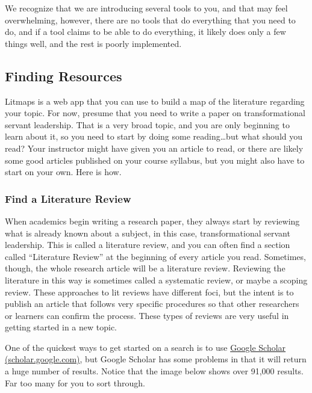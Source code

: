 \documentclass[
]{book}
\theoremstyle{definition}
\theoremstyle{definition}
\theoremstyle{definition}
\theoremstyle{definition}
\theoremstyle{remark}
\begin{document}
We recognize that we are introducing several tools to you, and that may feel overwhelming, however, there are no tools that do everything that you need to do, and if a tool claims to be able to do everything, it likely does only a few things well, and the rest is poorly implemented.

\hypertarget{finding-resources}{%
\subsection*{Finding Resources}\label{finding-resources}}

Litmaps is a web app that you can use to build a map of the literature regarding your topic. For now, presume that you need to write a paper on transformational servant leadership. That is a very broad topic, and you are only beginning to learn about it, so you need to start by doing some reading\ldots but what should you read? Your instructor might have given you an article to read, or there are likely some good articles published on your course syllabus, but you might also have to start on your own. Here is how.

\hypertarget{find-a-literature-review}{%
\subsubsection*{Find a Literature Review}\label{find-a-literature-review}}

When academics begin writing a research paper, they always start by reviewing what is already known about a subject, in this case, transformational servant leadership. This is called a literature review, and you can often find a section called ``Literature Review'' at the beginning of every article you read. Sometimes, though, the whole research article will be a literature review. Reviewing the literature in this way is sometimes called a systematic review, or maybe a scoping review. These approaches to lit reviews have different foci, but the intent is to publish an article that follows very specific procedures so that other researchers or learners can confirm the process. These types of reviews are very useful in getting started in a new topic.

One of the quickest ways to get started on a search is to use \href{https://scholar.google.com}{Google Scholar (scholar.google.com)}, but Google Scholar has some problems in that it will return a huge number of results. Notice that the image below shows over 91,000 results. Far too many for you to sort through.
\end{document}
